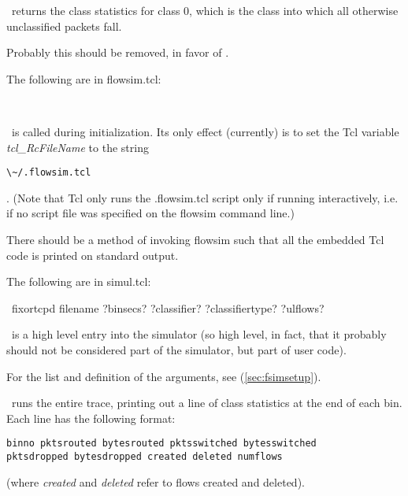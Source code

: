 \documentclass{article}
\begin{document}
\cmdname\ returns the class statistics for class 0, which is the class
into which all otherwise unclassified packets fall.

\BUGS

Probably this should be removed, in favor of
.

\SEEALSO


\manend

The following are in flowsim.tcl:


\SYNOPSIS \cmdname\

\DESCRIPTION

\cmdname\ is called during initialization.  Its only effect (currently)
is to set the Tcl variable \emph{tcl\_RcFileName} to the string
\begin{verbatim}\~/.flowsim.tcl\end{verbatim}.  (Note that Tcl only
runs the .flowsim.tcl script only if running interactively, i.e.
if no script file was specified on the flowsim command line.)

\BUGS

There should be a method of invoking flowsim such that all the embedded
Tcl code is printed on standard output.

\manend

The following are in simul.tcl:


\SYNOPSIS \cmdname\ fixortcpd filename ?binsecs? ?classifier?
?classifiertype? ?ulflows?

\cmdname\ is a high level entry into the simulator (so high level, in
fact, that it probably should not be considered part of the simulator,
but part of user code).

For the list and definition of the arguments, see 
(\ref{sec:fsimsetup}).

\cmdname\ runs the entire trace, printing out a line of class
statistics at the end of each bin.  Each line has the following format:
\begin{verbatim}
binno pktsrouted bytesrouted pktsswitched bytesswitched
pktsdropped bytesdropped created deleted numflows
\end{verbatim}
(where \emph{created} and \emph{deleted} refer to flows created and
deleted).

\SEEALSO

\end{document}
